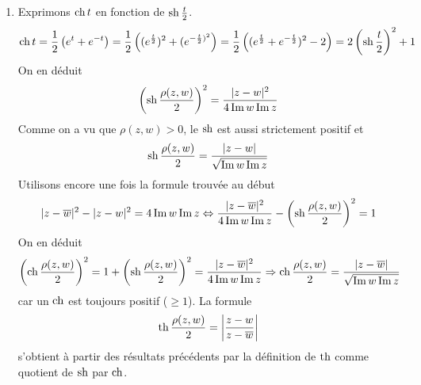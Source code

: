 \begin{enumerate}
\item Exprimons $\operatorname{ch} t$ en fonction de $\operatorname{sh}\frac{t}{2}$.
\begin{displaymath}
 \operatorname{ch} t =\dfrac{1}{2}\left(e^t + e^{-t} \right)
= \dfrac{1}{2}\left((e^{\frac{t}{2}})^2 + (e^{-\frac{t}{2})^2} \right) 
= \dfrac{1}{2}\left((e^{\frac{t}{2}} + e^{-\frac{t}{2}})^2 -2 \right)
= 2 \left( \operatorname{sh}\frac{t}{2}\right)^2  +1
\end{displaymath}
On en déduit
\begin{displaymath}
 \left( \operatorname{sh}\frac{\rho(z,w)}{2}\right)^2 = \dfrac{|z-w|^2}{4\operatorname{Im} w \operatorname{Im} z}
\end{displaymath}
Comme on a vu que $\rho(z,w)>0$, le $\operatorname{sh}$ est aussi strictement positif et
\begin{displaymath}
 \operatorname{sh}\frac{\rho(z,w)}{2} = \dfrac{|z-w|}{\sqrt{\operatorname{Im} w \operatorname{Im} z}}
\end{displaymath}
Utilisons encore une fois la formule trouvée au début
\begin{displaymath}
 |z-\overline{w}|^2 -|z-w|^2 = 4\operatorname{Im} w \operatorname{Im} z 
\Leftrightarrow \dfrac{|z-\overline{w}|^2}{4\operatorname{Im} w \operatorname{Im} z} - \left( \operatorname{sh}\frac{\rho(z,w)}{2}\right)^2 = 1
\end{displaymath}
On en déduit
\begin{displaymath}
 \left( \operatorname{ch}\frac{\rho(z,w)}{2}\right)^2 = 1 + \left( \operatorname{sh}\frac{\rho(z,w)}{2}\right)^2 = \dfrac{|z-\overline{w}|^2}{4\operatorname{Im} w \operatorname{Im} z}\\
\Rightarrow \operatorname{ch}\frac{\rho(z,w)}{2} = \dfrac{|z-\overline{w}|}{\sqrt{\operatorname{Im} w \operatorname{Im} z}}
\end{displaymath}
car un $\operatorname{ch}$ est toujours positif ($\geq 1$).\newline
La formule
\begin{displaymath}
 \operatorname{th}\frac{\rho(z,w)}{2} = \left \vert \dfrac{z-w}{z-\overline{w}}\right\vert
\end{displaymath}
s'obtient à partir des résultats précédents par la définition de $\operatorname{th}$ comme quotient de $\operatorname{sh}$ par $\operatorname{ch}$.
\end{enumerate}

